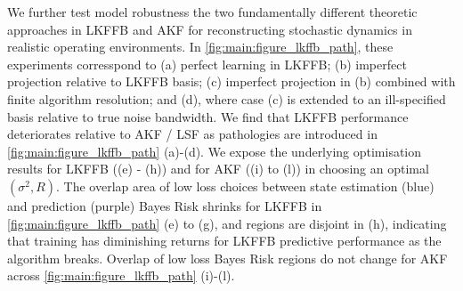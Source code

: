 We further test model robustness the two fundamentally different theoretic approaches in LKFFB and AKF for reconstructing stochastic dynamics in realistic operating environments. In \cref{fig:main:figure_lkffb_path}, these experiments corresspond to (a) perfect learning in LKFFB; (b) imperfect projection relative to LKFFB basis; (c) imperfect projection in (b) combined with finite algorithm resolution; and (d), where case (c)  is extended to an ill-specified basis relative to true noise bandwidth. We find that LKFFB performance deteriorates relative to AKF / LSF as pathologies are introduced in \cref{fig:main:figure_lkffb_path} (a)-(d). We expose the underlying optimisation results for LKFFB ((e) - (h)) and for AKF ((i) to (l)) in choosing an optimal $(\sigma^2, R)$. The overlap area of low loss choices between state estimation (blue) and prediction (purple) Bayes Risk shrinks for LKFFB in \cref{fig:main:figure_lkffb_path} (e) to (g), and regions are disjoint in (h), indicating that training has diminishing returns for LKFFB predictive performance as the algorithm breaks. Overlap of low loss Bayes Risk regions do not change for AKF across \cref{fig:main:figure_lkffb_path} (i)-(l).

